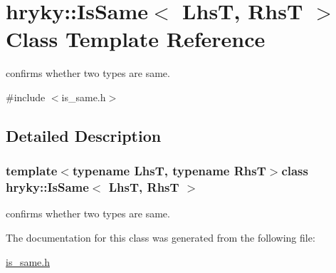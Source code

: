 \hypertarget{classhryky_1_1_is_same}{\section{hryky\-:\-:Is\-Same$<$ Lhs\-T, Rhs\-T $>$ Class Template Reference}
\label{classhryky_1_1_is_same}
}


confirms whether two types are same.  




{\ttfamily \#include $<$is\-\_\-same.\-h$>$}



\subsection{Detailed Description}
\subsubsection*{template$<$typename Lhs\-T, typename Rhs\-T$>$class hryky\-::\-Is\-Same$<$ Lhs\-T, Rhs\-T $>$}

confirms whether two types are same. 

The documentation for this class was generated from the following file\-:\begin{DoxyCompactItemize}
\item 
\hyperlink{is__same_8h}{is\-\_\-same.\-h}\end{DoxyCompactItemize}
